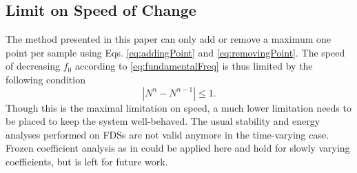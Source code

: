 \subsection{Limit on Speed of Change}
The method presented in this paper can only add or remove a maximum one point per sample using Eqs. \eqref{eq:addingPoint} and \eqref{eq:removingPoint}. The speed of decreasing $f_0$ according to \eqref{eq:fundamentalFreq} is thus limited by the following condition
\begin{equation}\label{eq:pointCondition}
    |N^n - N^{n-1}| \leq 1. 
\end{equation}
Though this is the maximal limitation on speed, a much lower limitation needs to be placed to keep the system well-behaved. The usual stability and energy analyses performed on FDSs are not valid anymore in the time-varying case. Frozen coefficient analysis as in \cite{Strikwerda1989} could be applied here and hold for slowly varying coefficients, but is left for future work. 

